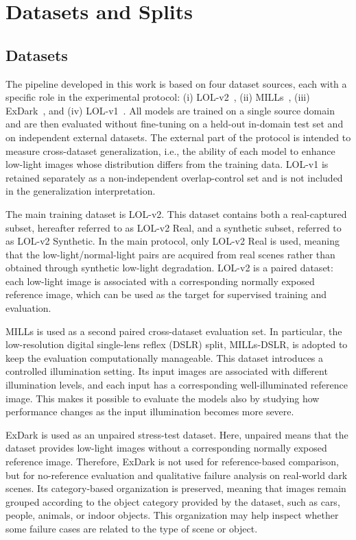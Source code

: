 \section{Datasets and Splits}
\label{sec:datasets_and_splits}

\subsection{Datasets}
\label{sec:datasets}

The pipeline developed in this work is based on four dataset sources, each with a specific role in the experimental protocol: (i) LOL-v2~\cite{DBLP:journals/tip/YangWHWL21}, (ii) MILLs~\cite{DBLP:journals/corr/abs-2511-15496}, (iii) ExDark~\cite{DBLP:journals/cviu/LohC19}, and (iv) LOL-v1~\cite{DBLP:conf/bmvc/WeiWY018}. All models are trained on a single source domain and are then evaluated without fine-tuning on a held-out in-domain test set and on independent external datasets. The external part of the protocol is intended to measure cross-dataset generalization, i.e., the ability of each model to enhance low-light images whose distribution differs from the training data. LOL-v1 is retained separately as a non-independent overlap-control set and is not included in the generalization interpretation.

The main training dataset is LOL-v2. This dataset contains both a real-captured subset, hereafter referred to as LOL-v2 Real, and a synthetic subset, referred to as LOL-v2 Synthetic. In the main protocol, only LOL-v2 Real is used, meaning that the low-light/normal-light pairs are acquired from real scenes rather than obtained through synthetic low-light degradation. LOL-v2 is a paired dataset: each low-light image is associated with a corresponding normally exposed reference image, which can be used as the target for supervised training and evaluation.

MILLs is used as a second paired cross-dataset evaluation set. In particular, the low-resolution digital single-lens reflex (DSLR) split, MILLs-DSLR, is adopted to keep the evaluation computationally manageable. This dataset introduces a controlled illumination setting. Its input images are associated with different illumination levels, and each input has a corresponding well-illuminated reference image. This makes it possible to evaluate the models also by studying how performance changes as the input illumination becomes more severe.

ExDark is used as an unpaired stress-test dataset. Here, unpaired means that the dataset provides low-light images without a corresponding normally exposed reference image. Therefore, ExDark is not used for reference-based comparison, but for no-reference evaluation and qualitative failure analysis on real-world dark scenes. Its category-based organization is preserved, meaning that images remain grouped according to the object category provided by the dataset, such as cars, people, animals, or indoor objects. This organization may help inspect whether some failure cases are related to the type of scene or object.

